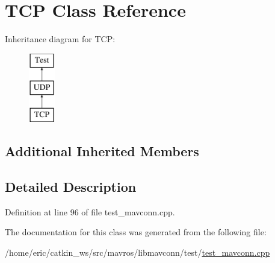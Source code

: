 \hypertarget{classTCP}{}\section{T\+CP Class Reference}
\label{classTCP}
Inheritance diagram for T\+CP\+:\begin{figure}[H]
\begin{center}
\leavevmode
\includegraphics[height=3.000000cm]{classTCP}
\end{center}
\end{figure}
\subsection*{Additional Inherited Members}


\subsection{Detailed Description}


Definition at line 96 of file test\+\_\+mavconn.\+cpp.



The documentation for this class was generated from the following file\+:\begin{DoxyCompactItemize}
\item 
/home/eric/catkin\+\_\+ws/src/mavros/libmavconn/test/\mbox{\hyperlink{test__mavconn_8cpp}{test\+\_\+mavconn.\+cpp}}\end{DoxyCompactItemize}
